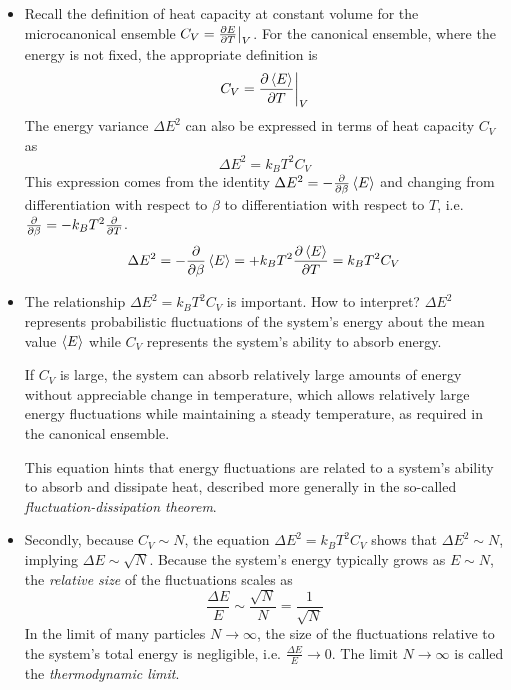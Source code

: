 \documentclass[11pt, a4paper]{article}
\begin{document}
\begin{itemize}
	\item Recall the definition of heat capacity at constant volume for the microcanonical ensemble $ C_{V} = \pdv{E}{T}\big |_{V} $. For the canonical ensemble, where the energy is not fixed, the appropriate definition is
	\begin{equation*}
		C_{V} = \pdv{\expval{E}}{T}\bigg |_{V}
	\end{equation*} 
	The energy variance $ \Delta E^{2} $ can also be expressed in terms of heat capacity $ C_{V} $ as
	\begin{equation*}
		\Delta E^{2} = k_{B}T^{2} C_{V}
	\end{equation*}
	This expression comes from the identity $ \Delta E^{2} = -\pdv{}{\beta} \expval{E} $ and changing from differentiation with respect to $ \beta $ to differentiation with respect to $ T $, i.e. $ \pdv{}{\beta} = - k_{B}T^{2} \pdv{}{T} $.
	\begin{equation*}
		\Delta E^{2} = -\pdv{}{\beta} \expval{E} = + k_{B}T^{2} \pdv{\expval{E} }{T} = k_{B}T^{2}C_{V}
	\end{equation*}
	
	\item The relationship $ \Delta E^{2} = k_{B}T^{2} C_{V} $ is important. How to interpret? $ \Delta E^{2} $ represents probabilistic fluctuations of the system's energy about the mean value $ \expval{E} $ while $ C_{V} $ represents the system's ability to absorb energy.
	
	If $ C_{V} $ is large, the system can absorb relatively large amounts of energy without appreciable change in temperature, which allows relatively large energy fluctuations while maintaining a steady temperature, as required in the canonical ensemble. 
	
	This equation hints that energy fluctuations are related to a system's ability to absorb and dissipate heat, described more generally in the so-called \textit{fluctuation-dissipation theorem}.
	
	\item Secondly, because $ C_{V} \sim N $, the equation $ \Delta E^{2} = k_{B}T^{2} C_{V} $ shows that $ \Delta E^{2} \sim N $, implying $ \Delta E \sim \sqrt{N} $. Because the system's energy typically grows as $ E \sim N $, the \textit{relative size} of the fluctuations scales as
	\begin{equation*}
		\frac{\Delta E}{E} \sim \frac{\sqrt{N}}{N} = \frac{1}{\sqrt{N}}
	\end{equation*}
	In the limit of many particles $ N \to \infty $, the size of the fluctuations relative to the system's total energy is negligible, i.e. $ \frac{\Delta E}{E} \to 0 $. The limit $ N \to \infty $ is called the \textit{thermodynamic limit}.
	

\end{itemize}
\end{document}
